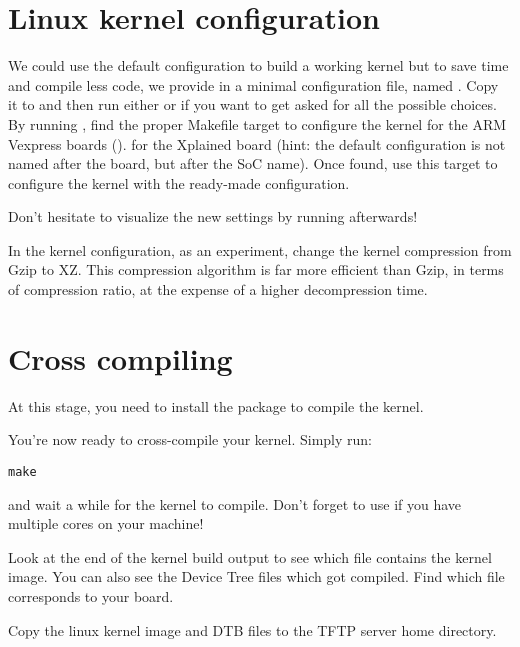 \section{Linux kernel configuration}

{
We could use the  default configuration to
build a working kernel but to save time and compile less code, we
provide in
 a minimal configuration
file, named . Copy it to  and
then run either  or  if
you want to get asked for all the possible choices.
}
{
By running , find the proper Makefile target to
configure the kernel
{for the ARM Vexpress boards ().}
{for the Xplained board (hint: the default
configuration is not named after the board, but after the SoC
name). Once found, use this target to configure the kernel with the
ready-made configuration.}
}

Don't hesitate to visualize the new settings by running
 afterwards!

In the kernel configuration, as an experiment, change the kernel
compression from Gzip to XZ. This compression algorithm is far more
efficient than Gzip, in terms of compression ratio, at the expense of
a higher decompression time.

\section{Cross compiling}

At this stage, you need to install the 
package to compile the kernel.

You're now ready to cross-compile your kernel. Simply run:

\begin{verbatim}
make
\end{verbatim}

and wait a while for the kernel to compile. Don't forget to use
 if you have multiple cores on your machine!

Look at the end of the kernel build output to see which file contains
the kernel image. You can also see the Device Tree  files
which got compiled. Find which  file corresponds to your
board.

Copy the linux kernel image and DTB files to the TFTP server
home directory.

